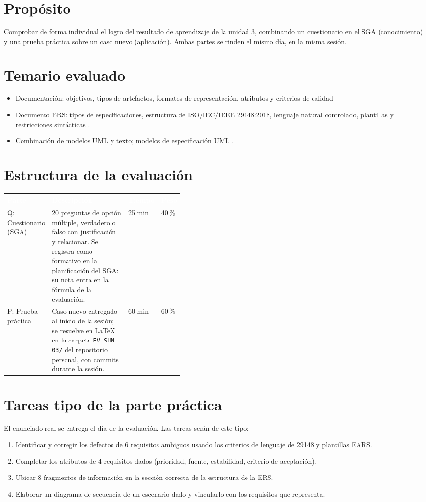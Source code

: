 \documentclass[11pt]{article}
\newcommand{\thdr}[1]{\cellcolor{utegreen}\textcolor{white}{\textbf{#1}}}
\newcommand{\seccion}[1]{\section{\textcolor{utegreendk}{#1}}}
\begin{document}
\seccion{Propósito}

Comprobar de forma individual el logro del resultado de aprendizaje de la unidad 3, combinando un cuestionario en el SGA (conocimiento) y una prueba práctica sobre un caso nuevo (aplicación). Ambas partes se rinden el mismo día, en la misma sesión.

\seccion{Temario evaluado}

\begin{itemize}[leftmargin=20pt,itemsep=2pt]
	\item Documentación: objetivos, tipos de artefactos, formatos de representación, atributos y criterios de calidad \citep{pohl_2025}.
	\item Documento ERS: tipos de especificaciones, estructura de ISO/\allowbreak{}IEC/\allowbreak{}IEEE 29148:2018, lenguaje natural controlado, plantillas y restricciones sintácticas \citep{iso29148_2018,mavin_ears_2009}.
	\item Combinación de modelos UML y texto; modelos de especificación UML \citep{omg_uml_2017}.
\end{itemize}

\seccion{Estructura de la evaluación}

\noindent\begin{tabularx}{\linewidth}{|L{0.20\linewidth}|Y|C{0.12\linewidth}|C{0.10\linewidth}|}
	\hline
	\thdr{Parte} & \thdr{Descripción} & \thdr{Tiempo} & \thdr{Peso}\\
	\hline
	Q: Cuestionario (SGA) & 20 preguntas de opción múltiple, verdadero o falso con justificación y relacionar. Se registra como formativo en la planificación del SGA; su nota entra en la fórmula de la evaluación. & 25 min & 40\,\%\\
	\hline
	 P: Prueba práctica & Caso nuevo entregado al inicio de la sesión; se resuelve en \LaTeX{} en la carpeta \texttt{EV-SUM-03/} del repositorio personal, con commits durante la sesión. & 60 min & 60\,\%\\
	\hline
\end{tabularx}

\seccion{Tareas tipo de la parte práctica}

El enunciado real se entrega el día de la evaluación. Las tareas serán de este tipo:

\begin{enumerate}[leftmargin=20pt,itemsep=2pt]
	\item Identificar y corregir los defectos de 6 requisitos ambiguos usando los criterios de lenguaje de 29148 y plantillas EARS.
	\item Completar los atributos de 4 requisitos dados (prioridad, fuente, estabilidad, criterio de aceptación).
	\item Ubicar 8 fragmentos de información en la sección correcta de la estructura de la ERS.
	\item Elaborar un diagrama de secuencia de un escenario dado y vincularlo con los requisitos que representa.
\end{enumerate}
\end{document}

